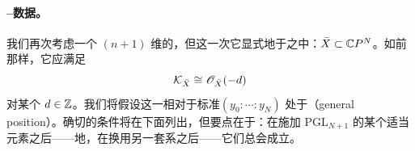 \paragraph{\trPicard--\trLefschetz{}数据。}\label{sub:picard-lefschetz-data}
我们再次考虑一个 $(n+1)$ 维的\trSmooth{}\trProjectiveVariety，但这一次它显式地\trEmbedding{}于\trProjectiveSpace{}之中：$\bar{X}\subset\mathbb{C}P^N$。如前那样，它应满足
\begin{equation}\label{eq:canonical-bundle-embedding}
\mathcal{K}_{\bar{X}}\cong\mathscr{O}_{\bar{X}}(-d)
\end{equation}
对某个 $d\in\mathbb{Z}$。我们将假设这一\trProjective{}\trEmbedding{}相对于标准\trHomogeneousCoordinates{}$(y_0:\cdots:y_N)$ 处于\textbf{\trGeneralPosition}（general position）。确切的条件将在下面列出，但要点在于：在施加 $\mathrm{PGL}_{N+1}$ 的某个适当元素之后——\trEquivalence{}地，在换用另一套\trHomogeneousCoordinates{}系之后——它们总会成立。

